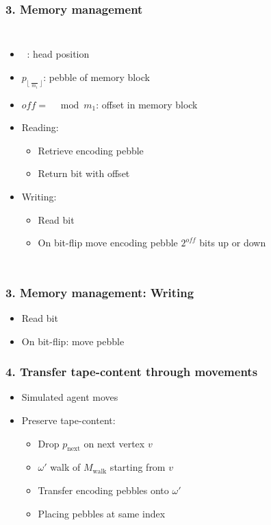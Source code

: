 \documentclass{beamer}
\DeclareMathOperator{\Thead}{T_{\text{head}}}
\begin{document}
\begin{frame}
  \frametitle{3. Memory management}
  \begin{columns}
    \begin{itemize}
      \item $\Thead$: head position
      \item $p_{\lfloor\frac{\Thead}{m_{1}}\rfloor}$: pebble of memory block
      \item $\mathit{off} = \Thead\mod m_{1}$: offset in memory block
      \item Reading:
        \begin{itemize}
          \item Retrieve encoding pebble
          \item Return bit with offset
        \end{itemize}
      \item Writing:
        \begin{itemize}
          \item Read bit
          \item On bit-flip move encoding pebble $2^{\mathit{off}}$ bits up or
            down
        \end{itemize}
    \end{itemize}
    \resizebox{\textwidth}{!}{}
    \resizebox{\textwidth}{!}{}
  \end{columns}
\end{frame}

\begin{frame}
  \frametitle{3. Memory management: Writing}
  \begin{itemize}
    \item Read bit
    \item On bit-flip: move pebble
  \end{itemize}
  \resizebox{\textwidth}{!}{}
\end{frame}

\begin{frame}
  \frametitle{4. Transfer tape-content through movements}
  \begin{itemize}
    \item Simulated agent moves
    \item Preserve tape-content:
      \begin{itemize}
        \item Drop $p_{\text{next}}$ on next vertex $v$
        \item $\omega'$ walk of $M_{\text{walk}}$ starting from $v$
        \item Transfer encoding pebbles onto $\omega'$
        \item Placing pebbles at same index
      \end{itemize}
  \end{itemize}
\end{frame}
\end{document}
